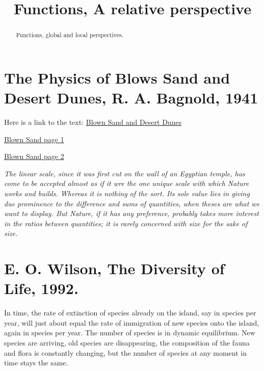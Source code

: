 \documentclass{ximera}
\title{Functions, A relative perspective}
\begin{document}
\begin{abstract}
Functions, global and local perspectives.
\end{abstract}
\maketitle


\section{The Physics of Blows Sand and Desert Dunes, R. A. Bagnold, 1941}

Here is a link to the text: \href{https://archive.org/details/in.ernet.dli.2015.220669/page/n27/mode/2up}{Blown Sand and Desert Dunes}


\begin{onlineOnly}
    \begin{center}
\end{center}
\end{onlineOnly}

\href{https://www.desmos.com/calculator/e2dsk4ldhj}{Blown Sand page 1}

\begin{onlineOnly}
    \begin{center}
\end{center}
\end{onlineOnly}

\href{https://www.desmos.com/calculator/jjeugcewrr}{Blown Sand page 2}

\emph{The linear scale, since it was first cut on the wall of an Egyptian temple, has come to be accepted almost as if it wre the one unique scale with which Nature works and builds. Whereas it is nothing of the sort. Its sole value lies in giving due prominence to the difference and sums of quantities, when theses are what we want to display. But Nature, if it has any preference, probably takes more interest in the ratios between quantities; it is  rarely concerned with size for the sake of size.}


\section{E. O. Wilson, The Diversity of Life, 1992.}

In time, the rate of extinction of species already on the island, say in species per year, will just about equal the rate of immigration of new species onto the island, again in species per year. The number of species is in dynamic equilibrium. New species are arriving, old species are disappearing, the composition of the fauna and flora is constantly changing, but the number of species at any moment in time stays the same.
\end{document}
